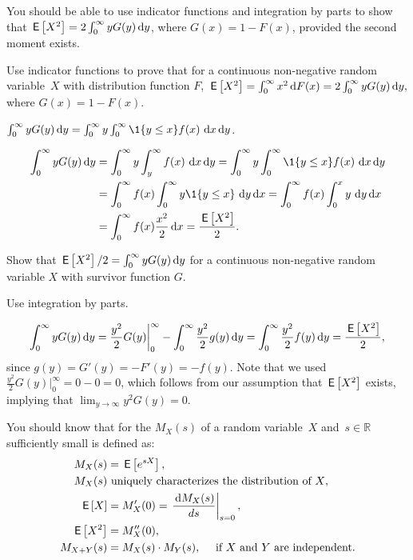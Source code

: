 You should be able to use indicator functions and integration by parts to show that $\,\mathsf{E}\left[X^2\right] = 2\int_0^\infty y G(y) \,\text{d}y$, where $G(x) = 1- F(x)$, provided the second moment exists.

\begin{extra}
  Use indicator functions to prove that for a continuous non-negative random variable~$X$ with distribution function $F$, $ \,\mathsf{E}\left[X^2\right] = \int_0^\infty x^2 \,\text{d}F(x) = 2 \int_0^\infty y G(y) \,\text{d}y,$ where $G(x) = 1 - F(x)$.
\begin{hint}
$\int_0^\infty y G(y) \d y = \int_0^\infty y \int_0^\infty \1{y\leq x}f(x)\, \d x \d y$.
\end{hint}
\begin{solution}
  \begin{align*}
\int_0^\infty y G(y) \d y 
&=  \int_0^\infty y \int_y^\infty f(x)\, \d x \d y =  \int_0^\infty y \int_0^\infty \1{y\leq x}f(x)\, \d x \d y\\
&=  \int_0^\infty f(x) \int_0^\infty y \1{y \leq x}\, \d y \d x
=  \int_0^\infty f(x) \int_0^x y\, \d y \d x\\
&=  \int_0^\infty f(x) \frac{x^2}2 \d x =\frac{\E{X^2}}2.
  \end{align*}
\end{solution}
\end{extra}

\begin{exercise}
  Show that $\,\mathsf{E}\left[X^2\right]/2 = \int_0^\infty y G(y) \,\text{d}y$  for a continuous non-negative random variable $X$ with survivor function $G$.
 \begin{solution}
   \begin{hint}
 Use integration by parts.     
   \end{hint}
  \begin{equation}
      \int_0^\infty y G(y) \,\text{d}y 
= \frac{y^2}2 G(y) \bigg|_0^\infty  - \int_0^\infty \frac{y^2}2 g(y)\,\text{d}y = \int_0^\infty \frac{y^2}2 f(y)\,\text{d}y = \frac{\,\mathsf{E}\left[X^2\right]}2,
  \end{equation}
  since $g(y) = G'(y) = - F'(y) = - f(y)$. Note that we used $\frac{y^2}2 G(y) \bigg|_0^\infty = 0 - 0 = 0$, which follows from our assumption that $\,\mathsf{E}\left[X^2\right]$ exists, implying that $\lim_{y \to \infty} y^2G(y) = 0$.
\end{solution}
\end{exercise}


You should know that for  the   $M_X(s)$ of a random variable~$X$ and~$s\in \mathbb{R}$  sufficiently small is defined as: 
\begin{subequations}
\begin{align}
  M_X(s) &= \,\mathsf{E}\left[e^{s X}\right], \\
  M_X(s) & \text{ uniquely characterizes the distribution of $X$}, \label{eq:75}\\
  \,\mathsf{E}\left[X\right] &= M_{X}'(0) = \left.\frac{\,\text{d}M_{X}(s)}{d s}\right|_{s=0},\label{eq:69}\\
\,\mathsf{E}\left[X^2\right] &= M_{X}''(0), \label{eq:64}\\
M_{X+Y}(s) &= M_X(s)\cdot M_Y(s), \quad \text{  if $X$ and $Y$ are independent}. \label{eq:73}
\end{align}
\end{subequations}


